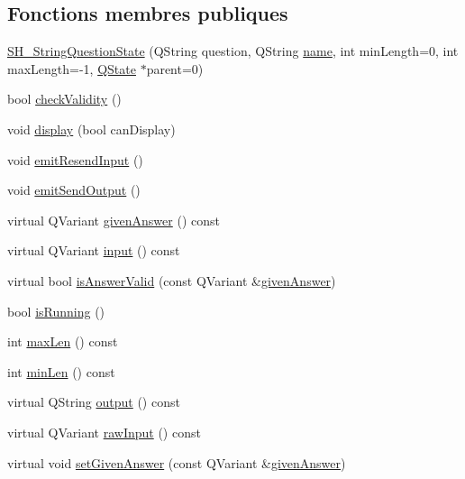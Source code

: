 \subsection*{Fonctions membres publiques}
\begin{DoxyCompactItemize}
\item 
\hyperlink{classSH__StringQuestionState_a83431733b36f67df8691b46cc93a1ea6}{S\-H\-\_\-\-String\-Question\-State} (Q\-String question, Q\-String \hyperlink{classSH__NamedObject_a9f686c6f2a5bcc08ad03d0cee0151f0f}{name}, int min\-Length=0, int max\-Length=-\/1, \hyperlink{classQState}{Q\-State} $\ast$parent=0)
\item 
bool \hyperlink{classSH__QuestionState_a902be003650c33d954d707b2d3ee0bb9}{check\-Validity} ()
\item 
void \hyperlink{classSH__InOutState_a616f88b20478b81b2927a9ddc2b4f521}{display} (bool can\-Display)
\item 
void \hyperlink{classSH__InOutState_ad1695493d39c5194e5b7c6372754ddd7}{emit\-Resend\-Input} ()
\item 
void \hyperlink{classSH__InOutState_a40995f4a8201f21d26b7e78b7e7b652e}{emit\-Send\-Output} ()
\item 
virtual Q\-Variant \hyperlink{classSH__QuestionState_a29cdea8bc55e39e3ed02d24743c30f8c}{given\-Answer} () const 
\item 
virtual Q\-Variant \hyperlink{classSH__InOutState_a8e1b78069343122df7713624a1a5a100}{input} () const 
\item 
virtual bool \hyperlink{classSH__StringQuestionState_a51448b87ffdb9279eaa5e7cc3ff73ce9}{is\-Answer\-Valid} (const Q\-Variant \&\hyperlink{classSH__QuestionState_a29cdea8bc55e39e3ed02d24743c30f8c}{given\-Answer})
\item 
bool \hyperlink{classSH__GenericState_a5f731810dad0cacd28828ccbf1539e4e}{is\-Running} ()
\item 
int \hyperlink{classSH__StringQuestionState_a6dce486c3484c28406b234b5f2f91288}{max\-Len} () const 
\item 
int \hyperlink{classSH__StringQuestionState_a24a95c3ce141e5e26f789720c59d2d3e}{min\-Len} () const 
\item 
virtual Q\-String \hyperlink{classSH__InOutState_a17ed7eaf5e3ed5af80a4f9fe65d5bfd9}{output} () const 
\item 
virtual Q\-Variant \hyperlink{classSH__InOutState_a4c674a54f41d2e6ef951b22393dcd89f}{raw\-Input} () const 
\item 
virtual void \hyperlink{classSH__QuestionState_a8fec0a91aed0b2b1699db17169873eb0}{set\-Given\-Answer} (const Q\-Variant \&\hyperlink{classSH__QuestionState_a29cdea8bc55e39e3ed02d24743c30f8c}{given\-Answer})

\end{DoxyCompactItemize}
